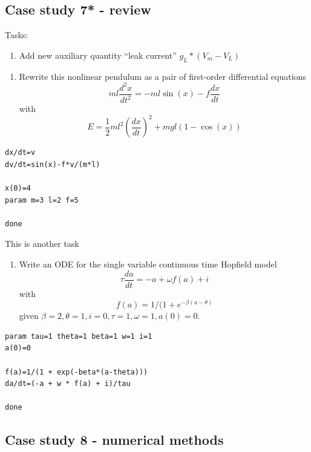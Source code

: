 \subsection{Case study 7* - review}
\label{sec:case-study-7}


Tasks:
\begin{enumerate}
\item Add new auxiliary quantity ``leak current'' $g_L*(V_m-V_L)$
\end{enumerate}

\begin{enumerate}
\item Rewrite this nonlinear pendulum as a pair of first-order
  differential equations
  \begin{equation}
    \label{eq:127}
    ml\frac{d^2x}{dt^2} = -ml\sin(x) - f\frac{dx}{dt}
  \end{equation}
with
\begin{equation}
  \label{eq:128}
  E = \frac{1}{2}ml^2 (\frac{dx}{dt})^2 + mgl(1-\cos(x))
\end{equation}
\end{enumerate}

\begin{verbatim}
dx/dt=v  
dv/dt=sin(x)-f*v/(m*l)

x(0)=4 
param m=3 l=2 f=5

done
\end{verbatim}

This is another task
\begin{enumerate}
\item Write an ODE for the single variable continuous time Hopfield
  model
  \begin{equation}
    \label{eq:129}
    \tau\frac{da}{dt} = -a + \omega f(a) + i
  \end{equation}
with 
\begin{equation}
  \label{eq:130}
  f(a) = 1/(1+e^{-\beta(a-\theta)}
\end{equation}
given $\beta=2, \theta=1, i=0, \tau=1, \omega=1, a(0)=0$.
\end{enumerate}
\begin{verbatim}
param tau=1 theta=1 beta=1 w=1 i=1
a(0)=0

f(a)=1/(1 + exp(-beta*(a-theta)))
da/dt=(-a + w * f(a) + i)/tau

done
\end{verbatim}

\subsection{Case study 8 - numerical methods}
\label{sec:case-study-8}

